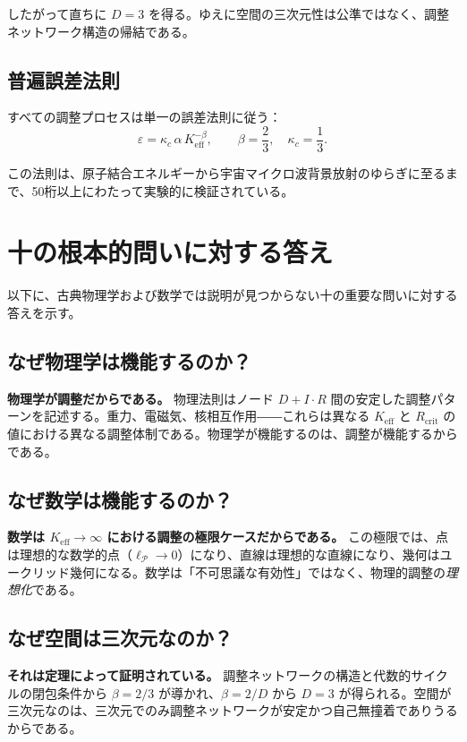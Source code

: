 \documentclass[12pt,a4paper]{article}
\newcommand{\Keff}{K_{\mathrm{eff}}}
\newcommand{\kappac}{\kappa_c}
\newcommand{\eps}{\varepsilon}
\newcommand{\betaf}{\beta}
\newcommand{\Rcrit}{R_{\mathrm{crit}}}
\newcommand{\calP}{\mathcal{P}}
\begin{document}
	したがって直ちに \(D = 3\) を得る。ゆえに空間の三次元性は公準ではなく、調整ネットワーク構造の帰結である。
	
	\subsection{普遍誤差法則}
	
	すべての調整プロセスは単一の誤差法則に従う：
	\[
	\eps = \kappac\,\alpha\,\Keff^{-\betaf}, \qquad \betaf = \frac{2}{3}, \quad \kappac = \frac{1}{3}.
	\]
	
	この法則は、原子結合エネルギーから宇宙マイクロ波背景放射のゆらぎに至るまで、50桁以上にわたって実験的に検証されている。
	
	\section{十の根本的問いに対する答え}
	
	以下に、古典物理学および数学では説明が見つからない十の重要な問いに対する答えを示す。
	
	\subsection{なぜ物理学は機能するのか？}
	
	\textbf{物理学が調整だからである。} 物理法則はノード \(D+I\cdot R\) 間の安定した調整パターンを記述する。重力、電磁気、核相互作用――これらは異なる \(\Keff\) と \(\Rcrit\) の値における異なる調整体制である。物理学が機能するのは、調整が機能するからである。
	
	\subsection{なぜ数学は機能するのか？}
	
	\textbf{数学は \(\Keff \to \infty\) における調整の極限ケースだからである。} この極限では、点は理想的な数学的点（\(\ell_{\calP} \to 0\)）になり、直線は理想的な直線になり、幾何はユークリッド幾何になる。数学は「不可思議な有効性」ではなく、物理的調整の\emph{理想化}である。
	
	\subsection{なぜ空間は三次元なのか？}
	
	\textbf{それは定理によって証明されている。} 調整ネットワークの構造と代数的サイクルの閉包条件から \(\betaf = 2/3\) が導かれ、\(\betaf = 2/D\) から \(D=3\) が得られる。空間が三次元なのは、三次元でのみ調整ネットワークが安定かつ自己無撞着でありうるからである。
	
\end{document}
